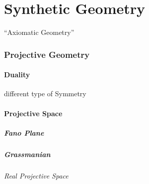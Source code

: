 \part{Synthetic Geometry}\label{part:synthetic_geometry}

``Axiomatic Geometry''



\section{Projective Geometry}\label{sec:projective_geometry}

\subsection{Duality}\label{sec:projective_duality}

different type of Symmetry %



\subsection{Projective Space}\label{sec:projective_space}

\subsubsection{Fano Plane}\label{sec:fano_plane}

\subsubsection{Grassmanian}\label{sec:grassmanian}

\paragraph{Real Projective Space}\label{sec:real_projective_space}\hfill

